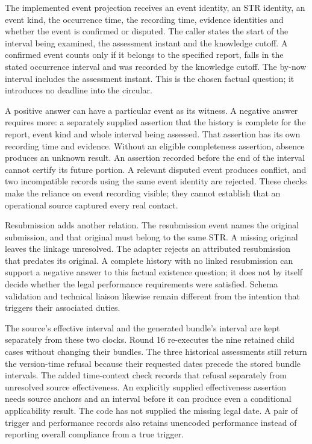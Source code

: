 The implemented event projection receives an event identity, an STR identity,
an event kind, the occurrence time, the recording time, evidence identities and
whether the event is confirmed or disputed. The caller states the start of the
interval being examined, the assessment instant and the knowledge cutoff. A
confirmed event counts only if it belongs to the specified report, falls in
the stated occurrence interval and was recorded by the knowledge cutoff. The
by-now interval includes the assessment instant. This is the chosen factual
question; it introduces no deadline into the circular.

A positive answer can have a particular event as its witness. A negative answer
requires more: a separately supplied assertion that the history is complete
for the report, event kind and whole interval being assessed. That assertion
has its own recording time and evidence. Without an eligible completeness
assertion, absence produces an unknown result. An assertion recorded before
the end of the interval cannot certify its future portion. A relevant disputed
event produces conflict, and two incompatible records using the same event
identity are rejected. These checks make the reliance on event recording
visible; they cannot establish that an operational source captured every real
contact.

Resubmission adds another relation. The resubmission event names the original
submission, and that original must belong to the same STR. A missing original
leaves the linkage unresolved. The adapter rejects an attributed resubmission
that predates its original. A complete history with no linked resubmission can
support a negative answer to this factual existence question; it does not by
itself decide whether the legal performance requirements were satisfied.
Schema validation and technical liaison likewise remain different from the
intention that triggers their associated duties.

The source's effective interval and the generated bundle's interval are kept
separately from these two clocks. Round 16 re-executes the nine retained child
cases without changing their bundles. The three historical assessments still
return the version-time refusal because their requested dates precede the
stored bundle intervals. The added time-context check records that refusal
separately from unresolved source effectiveness. An explicitly supplied
effectiveness assertion needs source anchors and an interval before it can
produce even a conditional applicability result. The code has not supplied the
missing legal date. A pair of trigger and performance records also retains
unencoded performance instead of reporting overall compliance from a true
trigger.

